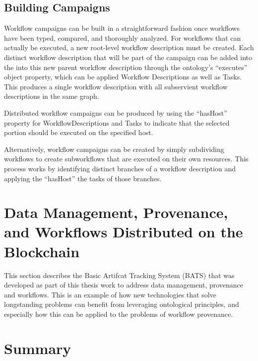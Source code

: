 \subsection{Building Campaigns}

Workflow campaigns can be built in a straightforward fashion once workflows have
been typed, compared, and thoroughly analyzed. For workflows that can actually
be executed, a new root-level workflow description must be created. Each
distinct workflow description that will be part of the campaign can be added
into the into this new parent workflow description through the ontology's
``executes'' object property, which can be applied Workflow Descriptions as
well as Tasks. This produces a single workflow description with all subservient
workflow descriptions in the same graph.

Distributed workflow campaigns can be produced by using the ``hasHost'' property
for WorkflowDescriptions and Tasks to indicate that the selected portion should
be executed on the specified host.

Alternatively, workflow campaigns can be created by simply subdividing
workflows to create subworkflows that are executed on their own resources. This
process works by identifying distinct branches of a workflow description and
applying the ``hasHost'' the tasks of those branches. 

\section{Data Management, Provenance, and Workflows Distributed on the
Blockchain}


This section describes the Basic Artifcat Tracking System (BATS) that
was developed as part of this thesis work to address data management,
provenance and workflows. This is an example of how new technologies that solve
longstanding problems can benefit from leveraging ontological principles, and
especially how this can be applied to the problems of workflow provenance.


\section{Summary}

